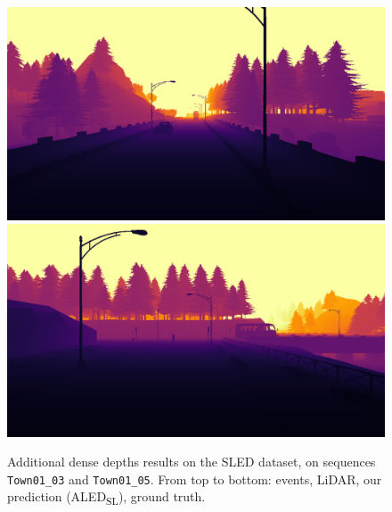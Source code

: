 \begin{figure}
  \includegraphics[width=0.465\linewidth]{mainmatter/figures/b_depth_conv/sled_dense_cmp_additional/gtprev000750.png}
  \includegraphics[width=0.465\linewidth]{mainmatter/figures/b_depth_conv/sled_dense_cmp_additional/gtprev000994.png}
  \cprotect\caption{Additional dense depths results on the SLED dataset, on sequences \verb|Town01_03| and \verb|Town01_05|. From top to bottom: events, LiDAR, our prediction (ALED\textsubscript{SL}), ground truth.}\label{fig:appendix:aled:sled_cmp_additional_good_1}
\end{figure}

